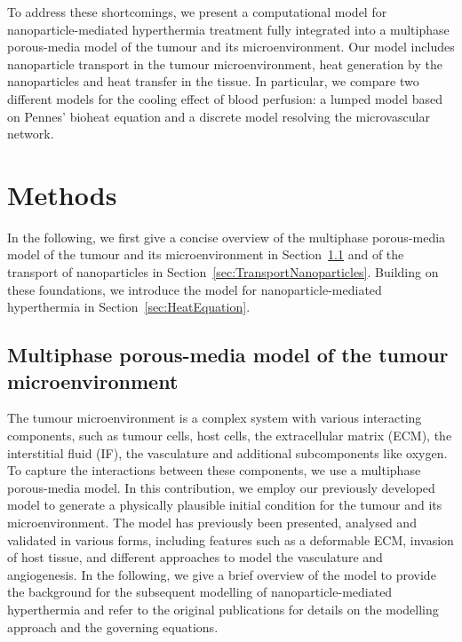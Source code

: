 \documentclass[Times1COL,AMA]{WileyNJDv5} %
\begin{document}
To address these shortcomings, we present a computational model for nanoparticle-mediated hyperthermia treatment fully integrated into a multiphase porous-media model of the tumour and its microenvironment.
Our model includes nanoparticle transport in the tumour microenvironment, heat generation by the nanoparticles and heat transfer in the tissue.
In particular, we compare two different models for the cooling effect of blood perfusion: a lumped model based on Pennes' bioheat equation and a discrete model resolving the microvascular network.

\section{Methods}\label{sec2}

In the following, we first give a concise overview of the multiphase porous-media model of the tumour and its microenvironment in Section~\ref{sec:MultiphaseModel} and of the transport of nanoparticles in Section~\ref{sec:TransportNanoparticles}.
Building on these foundations, we introduce the model for nanoparticle-mediated hyperthermia in Section~\ref{sec:HeatEquation}.

\subsection{Multiphase porous-media model of the tumour microenvironment}\label{sec:MultiphaseModel}

The tumour microenvironment is a complex system with various interacting components, such as tumour cells, host cells, the extracellular matrix (ECM), the interstitial fluid (IF), the vasculature and additional subcomponents like oxygen.
To capture the interactions between these components, we use a multiphase porous-media model.
In this contribution, we employ our previously developed model \cite{Sciume2013, Kremheller2018, Kremheller2019} to generate a physically plausible initial condition for the tumour and its microenvironment.
The model has previously been presented, analysed and validated in various forms, including features such as a deformable ECM,\cite{Sciume2014a} invasion of host tissue,\cite{Sciume2014b} and different approaches to model the vasculature and angiogenesis. \cite{Kremheller2018, Kremheller2019}
In the following, we give a brief overview of the model to provide the background for the subsequent modelling of nanoparticle-mediated hyperthermia and refer to the original publications for details on the modelling approach and the governing equations.
\end{document}
